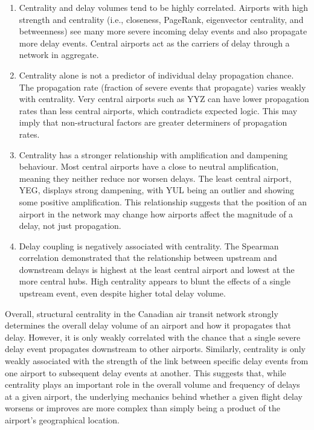 \documentclass[10pt]{article}
\begin{document}
\begin{enumerate}
    \item Centrality and delay volumes tend to be highly correlated. Airports with high strength and centrality (i.e., closeness, PageRank, eigenvector centrality, and betweenness) see many more severe incoming delay events and also propagate more delay events. Central airports act as the carriers of delay through a network in aggregate.

    \item Centrality alone is not a predictor of individual delay propagation chance. The propagation rate (fraction of severe events that propagate) varies weakly with centrality. Very central airports such as YYZ can have lower propagation rates than less central airports, which contradicts expected logic. This may imply that non-structural factors are greater determiners of propagation rates.

    \item Centrality has a stronger relationship with amplification and dampening behaviour. Most central airports have a close to neutral amplification, meaning they neither reduce nor worsen delays. The least central airport, YEG, displays strong dampening, with YUL being an outlier and showing some positive amplification. This relationship suggests that the position of an airport in the network may change how airports affect the magnitude of a delay, not just propagation.

    \item Delay coupling is negatively associated with centrality. The Spearman correlation demonstrated that the relationship between upstream and downstream delays is highest at the least central airport and lowest at the more central hubs. High centrality appears to blunt the effects of a single upstream event, even despite higher total delay volume.
\end{enumerate}

Overall, structural centrality in the Canadian air transit network strongly determines the overall delay volume of an airport and how it propagates that delay. However, it is only weakly correlated with the chance that a single severe delay event propagates downstream to other airports. Similarly, centrality is only weakly associated with the strength of the link between specific delay events from one airport to subsequent delay events at another. This suggests that, while centrality plays an important role in the overall volume and frequency of delays at a given airport, the underlying mechanics behind whether a given flight delay worsens or improves are more complex than simply being a product of the airport's geographical location.
\end{document}
